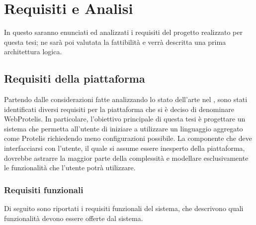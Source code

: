 \chapter{Requisiti e Analisi}\label{ch:requirements}
  In questo  saranno enunciati ed analizzati i requisiti del progetto realizzato per questa tesi;
  ne sarà poi valutata la fattibilità e verrà descritta una prima architettura logica.

  \section{Requisiti della piattaforma}
    Partendo dalle considerazioni fatte analizzando lo stato dell'arte nel , sono stati identificati diversi requisiti per la piattaforma che si è deciso di denominare WebProtelis.
    In particolare, l'obiettivo principale di questa tesi è progettare un sistema che permetta all'utente di iniziare a utilizzare un linguaggio aggregato come Protelis richiedendo meno configurazioni possibile.
    La componente che deve interfacciarsi con l'utente, il quale si assume essere inesperto della piattaforma, dovrebbe astrarre la maggior parte della complessità e modellare esclusivamente le funzionalità che l'utente potrà utilizzare.

    \subsection{Requisiti funzionali}\label{subsec:req:fun}
      Di seguito sono riportati i requisiti funzionali del sistema, che descrivono quali funzionalità devono essere offerte dal sistema.

